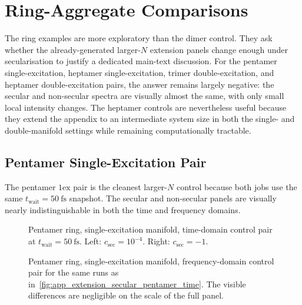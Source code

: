 \section{Ring-Aggregate Comparisons}
\label{app:sec:extension_secular_rings}

The ring examples are more exploratory than the dimer control. They ask whether
the already-generated larger-\(N\) extension panels change enough under
secularisation to justify a dedicated main-text discussion. For the pentamer
single-excitation, heptamer single-excitation, trimer double-excitation, and
heptamer double-excitation pairs, the answer remains largely negative: the
secular and non-secular spectra are visually almost the same, with only small
local intensity changes. The heptamer controls are nevertheless useful because
they extend the appendix to an intermediate system size in both the
single- and double-manifold settings while remaining computationally tractable.

\subsection{Pentamer Single-Excitation Pair}

The pentamer \(1\mathrm{ex}\) pair is the cleanest larger-\(N\) control because
both jobs use the same \(t_{\mathrm{wait}}=\SI{50}{\femto\second}\) snapshot.
The secular and non-secular panels are visually nearly indistinguishable in
both the time and frequency domains.

\begin{figure}[htbp]
    \centering
    \begin{minipage}[t]{0.49\linewidth}
        \centering
        \safeplaceholdergraphic[1.18\linewidth]{\pentamerSecTimePath}
    \end{minipage}\hfill
    \begin{minipage}[t]{0.49\linewidth}
        \centering
        \safeplaceholdergraphic[1.18\linewidth]{\pentamerNonSecTimePath}
    \end{minipage}
    \caption{Pentamer ring, single-excitation manifold, time-domain control
    pair at \(t_{\mathrm{wait}}=\SI{50}{\femto\second}\). Left:
    \(c_{\mathrm{sec}}=10^{-4}\). Right: \(c_{\mathrm{sec}}=-1\).}
    \label{fig:app_extension_secular_pentamer_time}
\end{figure}

\begin{figure}[htbp]
    \centering
    \begin{minipage}[t]{0.49\linewidth}
        \centering
        \safeplaceholdergraphic[1.18\linewidth]{\pentamerSecFreqPath}
    \end{minipage}\hfill
    \begin{minipage}[t]{0.49\linewidth}
        \centering
        \safeplaceholdergraphic[1.18\linewidth]{\pentamerNonSecFreqPath}
    \end{minipage}
    \caption{Pentamer ring, single-excitation manifold, frequency-domain
    control pair for the same runs as
    in~\autoref{fig:app_extension_secular_pentamer_time}. The visible
    differences are negligible on the scale of the full panel.}
    \label{fig:app_extension_secular_pentamer_freq}
\end{figure}

